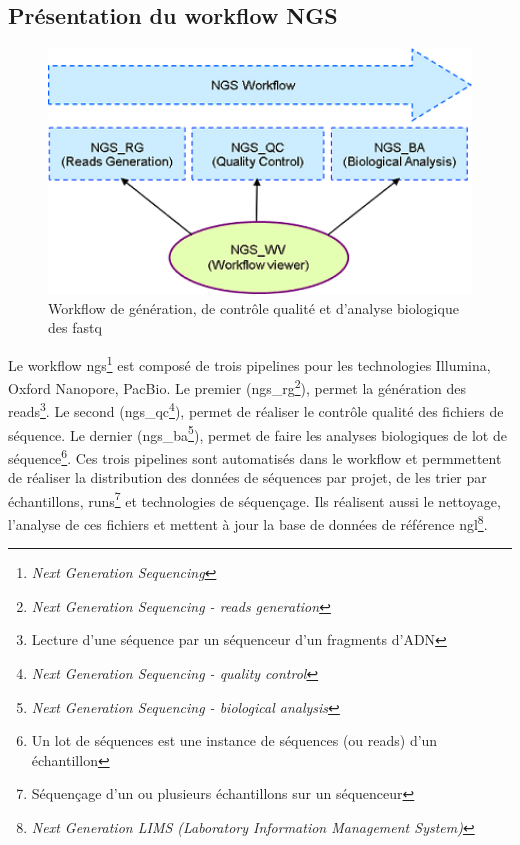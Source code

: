 \subsection{Présentation du workflow NGS}
\begin{minipage}{0.45\textwidth}
	\begin{figure}[H]
		\centering
		\includegraphics[width=1\textwidth]{img/Workflow.png}
		\caption{\footnotesize{Workflow de génération, de contrôle qualité et d’analyse biologique des fastq}}
		\label{worflow-genoscope}
	\end{figure}
\end{minipage} 
\hfill
\begin{minipage}{0.45\textwidth}
	Le workflow ngs\footnote{\emph{Next Generation Sequencing}} est composé de trois pipelines pour les technologies Illumina, Oxford Nanopore, PacBio. Le premier (ngs\_rg\footnote{\emph{Next Generation Sequencing - reads generation}}), permet la génération des reads\footnote{Lecture d'une séquence par un séquenceur d'un fragments d'ADN}. Le second (ngs\_qc\footnote{\emph{Next Generation Sequencing - quality control}}), permet de réaliser le contrôle qualité des fichiers de séquence. Le dernier (ngs\_ba\footnote{\emph{Next Generation Sequencing - biological analysis}}), permet de faire les analyses biologiques de lot de séquence\footnote{Un lot de séquences est une instance de séquences (ou reads) d'un échantillon}. Ces trois pipelines sont automatisés dans le workflow et permmettent de réaliser la distribution des données de séquences par projet, de les trier par échantillons, runs\footnote{Séquençage d'un ou plusieurs échantillons sur un séquenceur} et technologies de séquençage. Ils réalisent aussi le nettoyage, l'analyse de ces fichiers et mettent à jour la base de données de référence ngl\footnote{\emph{Next Generation LIMS (Laboratory Information Management System)}}.
\end{minipage} 

